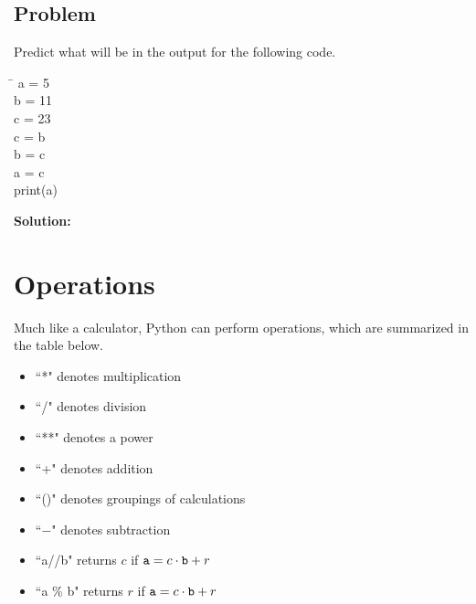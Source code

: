 \documentclass{article}
\newcommand{\icode}[1]{{\ttfamily #1}}
\begin{document}
\subsection{Problem}
Predict what will be in the output for the following code.
\begin{tcolorbox}
	\ttfamily
	\begin{tabbing}
		\hspace{3.25 in}\=\hspace{3.25 in} \kill
		a = 5\\
		b = 11\\
		c = 23\\
		c = b\\
		b = c\\
		a = c\\
		print(a)
	\end{tabbing}
\end{tcolorbox}
\noindent\textbf{Solution:}
\begin{tcolorbox}[colback=output]
\end{tcolorbox}
\section{Operations}
Much like a calculator, Python can perform operations, which are summarized in the table below.
\begin{multicols}{2}
\begin{itemize}
	\item ``*" denotes multiplication
	\item ``/" denotes division
	\item ``**" denotes a power
	\item ``+" denotes addition
	\item ``()" denotes groupings of calculations
	\item ``$-$" denotes subtraction
	\item ``\icode{a}//\icode{b}" returns $c$ if $\text{\icode{a}} = c \cdot \text{\icode{b}} + r$
	\item ``\icode{a} \% \icode{b}" returns $r$ if $\text{\icode{a}} = c \cdot \text{\icode{b}} + r$
	
\end{itemize}
\end{multicols}
\end{document}
